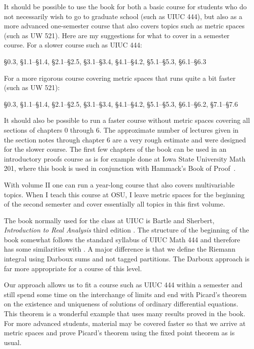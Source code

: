 \documentclass[12pt]{book}
\theoremstyle{plain}
\theoremstyle{remark}
\theoremstyle{definition}
\theoremstyle{exercise}
\theoremstyle{example}
\begin{document}
It should be possible to use the book for
both a basic course for students who do not necessarily wish to
go to graduate school (such as UIUC 444), but also as a more advanced one-semester
course that also covers topics such as metric spaces (such as UW 521).
Here are my suggestions for what to cover in a semester course.  For a
slower course such as UIUC 444:
\begin{center}
\S0.3, \S1.1--\S1.4, \S2.1--\S2.5, \S3.1--\S3.4, \S4.1--\S4.2,
\S5.1--\S5.3, \S6.1--\S6.3
\end{center}
For a more rigorous course covering metric spaces that runs quite a bit faster
(such as UW 521):
\begin{center}
\S0.3, \S1.1--\S1.4, \S2.1--\S2.5, \S3.1--\S3.4, \S4.1--\S4.2,
\S5.1--\S5.3, \S6.1--\S6.2, \S7.1--\S7.6
\end{center}
It should also be possible to run a faster course without metric spaces
covering all sections of chapters 0 through 6.  The approximate number of
lectures given in the section notes through chapter 6 are a very rough
estimate and were designed for the slower course.
The first few chapters of the book can be used in an introductory proofs
course as is for example done at Iowa State University Math 201, where 
this book is used in conjunction with Hammack's Book of Proof~\cite{Hammack}.

With volume II one can run a year-long course that also covers multivariable
topics.  When I teach this course at OSU, I leave
metric spaces for the beginning of the
second semester and cover essentially all topics in this
first volume.

The book normally used for the class at UIUC is Bartle and Sherbert,
\emph{Introduction to Real Analysis} third edition
\cite{BS}.
The structure of the beginning of the book somewhat follows the
standard syllabus of UIUC Math 444 and therefore has some similarities with
\cite{BS}.
A major difference is that we define the Riemann integral using
Darboux sums and not tagged partitions.  The Darboux approach is far more
appropriate for a course of this level.

Our approach allows us to fit a course such as UIUC 444 within a semester
and still spend some time on the interchange of limits and end with
Picard's theorem on the existence and uniqueness of solutions of ordinary
differential equations.
This theorem is a wonderful example
that uses many results proved in the book.  For more advanced students,
material may be covered faster so that we arrive at metric spaces and
prove Picard's theorem using the fixed point theorem as is usual.
\end{document}
